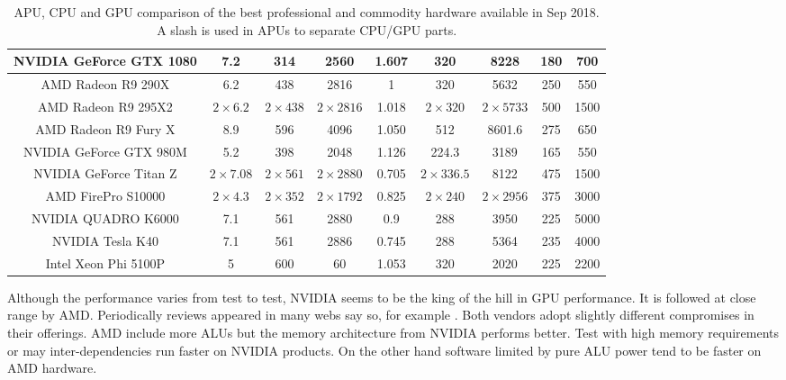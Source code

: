 \documentclass{article}
\begin{document}
\begin{table}[!ht]
{\begin{tabular}{|c|c|c|c|c|c|c|c|c|}
NVIDIA GeForce GTX 1080 & 7.2           & 314          & 2560          & 1.607      & 320          & 8228           & 180 & 700    \\
\hline
\hline
AMD Radeon R9 290X      & 6.2           & 438          & 2816          & 1          & 320          & 5632           & 250 & 550    \\
\hline
AMD Radeon R9 295X2     & $2\times6.2$  & $2\times438$ & $2\times2816$ & 1.018      & $2\times320$ & $2\times5733$  & 500 & 1500   \\
\hline
AMD Radeon R9 Fury X    & 8.9           & 596          & 4096          & 1.050      & 512          & 8601.6         & 275 & 650    \\
\hline
NVIDIA GeForce GTX 980M & 5.2           & 398          & 2048          & 1.126      & 224.3        & 3189           & 165 & 550    \\
\hline
NVIDIA GeForce Titan Z  & $2\times7.08$ & $2\times561$ & $2\times2880$ & 0.705      & $2\times336.5$ & 8122         & 475 & 1500   \\
\hline
\hline
AMD FirePro S10000      & $2\times4.3$  & $2\times352$ & $2\times1792$ & 0.825      & $2\times240$ & $2\times2956$  & 375 & 3000   \\
\hline
NVIDIA QUADRO K6000     & 7.1           & 561          & 2880          & 0.9        & 288          & 3950           & 225 & 5000   \\
\hline
\hline
NVIDIA Tesla K40        & 7.1           & 561          & 2886          & 0.745      & 288          & 5364           & 235 & 4000   \\
\hline
Intel Xeon Phi 5100P    & 5             & 600          & 60            & 1.053      & 320          & 2020           & 225 & 2200   \\
\hline

\end{tabular}
}
\caption{APU, CPU and GPU comparison of the best professional and commodity hardware available in Sep 2018. A slash is used in APUs to separate CPU/GPU parts. \label{tab:features}}
\end{table}

Although the performance varies from test to test, NVIDIA seems to be the king of the hill in GPU performance. It is followed at close range by AMD. Periodically reviews appeared in many webs say so, for example \cite{benchmarkGPU2016}. Both vendors adopt slightly different compromises in their offerings. AMD include more ALUs but the memory architecture from NVIDIA performs better. Test with high memory requirements or may inter-dependencies run faster on NVIDIA products. On the other hand software limited by pure ALU power tend to be faster on AMD hardware.
\end{document}
